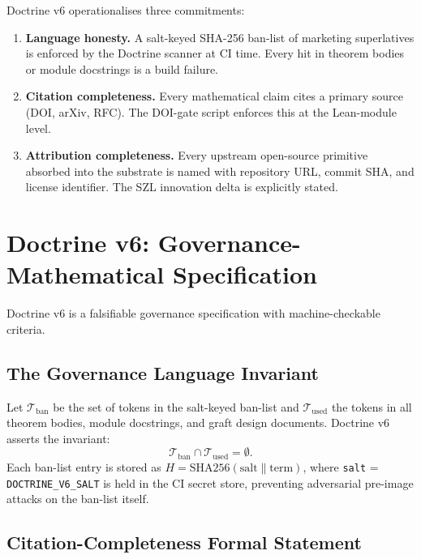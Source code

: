 Doctrine v6 operationalises three commitments:

\begin{enumerate}
  \item \textbf{Language honesty.}  A salt-keyed SHA-256 ban-list of
    marketing superlatives is enforced by the Doctrine scanner at CI
    time.  Every hit in theorem bodies or module docstrings is a build
    failure.
  \item \textbf{Citation completeness.}  Every mathematical claim cites
    a primary source (DOI, arXiv, RFC).  The DOI-gate script enforces
    this at the Lean-module level.
  \item \textbf{Attribution completeness.}  Every upstream open-source
    primitive absorbed into the substrate is named with repository URL,
    commit SHA, and license identifier.  The SZL innovation delta is
    explicitly stated.
\end{enumerate}


\section{Doctrine v6: Governance-Mathematical Specification}
\label{sec:docv6-detail}

Doctrine v6 is a falsifiable governance specification with
machine-checkable criteria.

\subsection{The Governance Language Invariant}

Let \(\mathcal{T}_{\text{ban}}\) be the set of tokens in the salt-keyed
ban-list and \(\mathcal{T}_{\text{used}}\) the tokens in all theorem
bodies, module docstrings, and graft design documents.
Doctrine v6 asserts the invariant:
\[
  \mathcal{T}_{\text{ban}} \cap \mathcal{T}_{\text{used}} = \emptyset.
\]
Each ban-list entry is stored as \(H = \mathrm{SHA256}(\text{salt} \| \text{term})\),
where \texttt{salt} = \texttt{DOCTRINE\_V6\_SALT} is held in the CI
secret store, preventing adversarial pre-image attacks on the ban-list
itself.

\subsection{Citation-Completeness Formal Statement}


